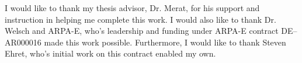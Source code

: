 I would like to thank my thesis advisor, Dr. Merat, for his support and instruction in helping me complete this work. I would also like to thank Dr. Welsch and ARPA-E, who's leadership and funding under ARPA-E contract DE--AR000016 made this work possible. Furthermore, I would like to thank Steven Ehret, who's initial work on this contract enabled my own.

